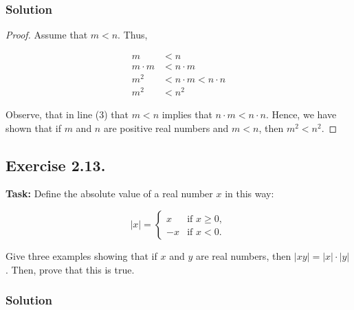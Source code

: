 \documentclass{article}
\begin{document}
\subsubsection*{Solution}

\begin{proof}

Assume that $m < n$. Thus,

    \begin{align}
        m &< n\\
        m \cdot m &< n \cdot m  \\
        m^2 &< n \cdot m < n \cdot n\\
        m^2 &< n^2 
    \end{align}

    Observe, that in line (3) that $m < n$ implies that $n \cdot m < n \cdot n$. Hence, we have shown that if $m$ and $n$ are positive real numbers and $m < n$, then $m^2 < n^2$.
\end{proof}

\newpage

\subsection{Exercise 2.13.}
\textbf{Task:} Define the absolute value of a real number $x$ in this way:

\[
|x| = \begin{cases} 
x & \text{if } x \geq 0, \\
-x & \text{if } x < 0.
\end{cases}
\]

\noindent Give three examples showing that if $x$ and $y$ are real numbers, then $|xy|=|x|\cdot|y|$. Then, prove that this is true.

\subsubsection*{Solution}
\end{document}
